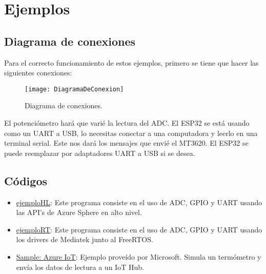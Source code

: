 \section{Ejemplos}
\subsection{Diagrama de conexiones}
Para el correcto funcionamiento de estos ejemplos, primero se tiene que hacer las siguientes conexiones:
\begin{figure}[h]
	\centering
	\texttt{[image: DiagramaDeConexion]}
	\caption{Diagrama de conexiones.}
\end{figure}
\linebreak
El potenciómetro hará que varié la lectura del ADC. El ESP32 se está usando como un UART a USB, lo necesitas conectar a una computadora y leerlo en una terminal serial. Este nos dará los mensajes que envié el MT3620. El ESP32 se puede reemplazar por adaptadores UART a USB si se desea.
\pagebreak
\subsection{Códigos}
\label{sec:codigos}
\begin{itemize}
	\item 
	\href{https://github.com/Javier20060904/ejemplo_HL}{ejemplo\textunderscore HL}: Este programa consiste en el uso de ADC, GPIO y UART usando las API's de Azure Sphere en alto nivel.
	\item
	\href{https://github.com/Javier20060904/ejemplo_RT}{ejemplo\textunderscore RT}:  Este programa consiste en el uso de ADC, GPIO y UART usando los drivers de Mediatek junto al FreeRTOS.
	\item 
	\href{https://github.com/Azure/azure-sphere-samples/tree/main/Samples/AzureIoT}{Sample: Azure IoT}: Ejemplo proveído por Microsoft. Simula un termómetro y envía los datos de lectura a un IoT Hub.
\end{itemize}


